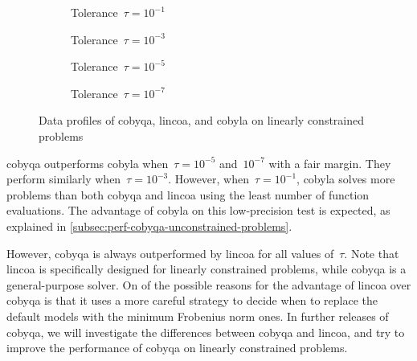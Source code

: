 \begin{figure}[ht]
    \centering
    \begin{subfigure}[b]{0.49\textwidth}
        \centering
        \caption{Tolerance~$\tau = 10^{-1}$}
    \end{subfigure}
    \hfill
    \begin{subfigure}[b]{0.49\textwidth}
        \centering
        \caption{Tolerance~$\tau = 10^{-3}$}
    \end{subfigure}
    \begin{subfigure}[b]{0.49\textwidth}
        \centering
        \caption{Tolerance~$\tau = 10^{-5}$}
    \end{subfigure}
    \hfill
    \begin{subfigure}[b]{0.49\textwidth}
        \centering
        \caption{Tolerance~$\tau = 10^{-7}$}
    \end{subfigure}
    \caption[Data profiles on linearly constrained problems]{Data profiles of \gls{cobyqa}, \gls{lincoa}, and \gls{cobyla} on linearly constrained problems}
    \label{fig:data-linearly-constrained-problems}
\end{figure}

\gls{cobyqa} outperforms \gls{cobyla} when~$\tau = 10^{-5}$ and~$10^{-7}$ with a fair margin.
They perform similarly when~$\tau = 10^{-3}$.
However, when~$\tau = 10^{-1}$, \gls{cobyla} solves more problems than both \gls{cobyqa} and \gls{lincoa} using the least number of function evaluations.
The advantage of \gls{cobyla} on this low-precision test is expected, as explained in \cref{subsec:perf-cobyqa-unconstrained-problems}.

However, \gls{cobyqa} is always outperformed by \gls{lincoa} for all values of~$\tau$.
Note that \gls{lincoa} is specifically designed for linearly constrained problems, while \gls{cobyqa} is a general-purpose solver.
On of the possible reasons for the advantage of \gls{lincoa} over \gls{cobyqa} is that it uses a more careful strategy to decide when to replace the default models with the minimum Frobenius norm ones.
In further releases of \gls{cobyqa}, we will investigate the differences between \gls{cobyqa} and \gls{lincoa}, and try to improve the performance of \gls{cobyqa} on linearly constrained problems.

